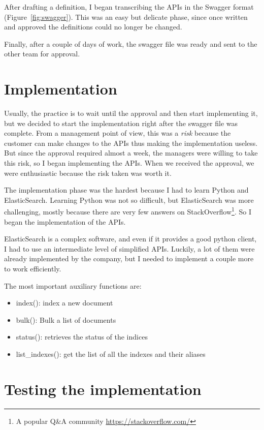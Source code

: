 After drafting a definition, I began transcribing the APIs in the
Swagger format (Figure~\ref{fig:swagger}).  This was an easy but
delicate phase, since once written and approved the definitions could
no longer be changed.

Finally, after a couple of days of work, the swagger file was ready
and sent to the other team for approval.



\section{Implementation}
\label{sec:imple}
Usually, the practice is to wait until the approval and then start
implementing it, but we decided to start the implementation right after the
swagger file was complete.  From a management point of view, this was a
\textit{risk} because the customer can make changes to the APIs thus
making the implementation useless.  But since the approval required
almost a week, the managers were willing to take this risk, so I began
implementing the APIs.  When we received the approval, we were
enthusiastic because the risk taken was worth it.

The implementation phase was the hardest because I had to learn Python
and ElasticSearch.  Learning Python was not so difficult, but
ElasticSearch was more challenging, mostly because there are very few
answers on StackOverflow\footnote{ A popular Q\&A community
  \url{https://stackoverflow.com/}}.  So I began the implementation of
the APIs.

ElasticSearch is a complex software, and even if it provides a good
python client, I had to use an intermediate level of simplified
APIs. Luckily, a lot of them were already implemented by the company,
but I needed to implement a couple more to work efficiently.

The most important auxiliary functions are:
\begin{itemize}
    \item index(): index a new document
    \item bulk(): Bulk a list of documents
    \item status():  retrieves the status of the indices
    \item list\_indexes():  get the list of all the indexes and their aliases
\end{itemize}



\section{Testing the implementation}
\label{sec:test}

